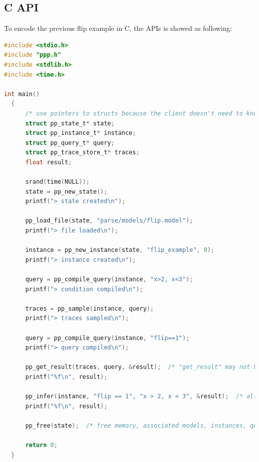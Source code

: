 \subsection{C API}
To encode the previous flip example in C, the APIs is showed as following:
\begin{lstlisting}[language=C]
#include <stdio.h>
#include "ppp.h"
#include <stdlib.h>
#include <time.h>

int main()
  {
      /* use pointers to structs because the client doesn't need to know the struct sizes */
      struct pp_state_t* state;
      struct pp_instance_t* instance;
      struct pp_query_t* query;
      struct pp_trace_store_t* traces;
      float result;

      srand(time(NULL));
      state = pp_new_state();
      printf("> state created\n");

      pp_load_file(state, "parse/models/flip.model");
      printf("> file loaded\n");

      instance = pp_new_instance(state, "flip_example", 0);
      printf("> instance created\n");

      query = pp_compile_query(instance, "x>2, x<3");
      printf("> condition compiled\n");

      traces = pp_sample(instance, query);
      printf("> traces sampled\n");

      query = pp_compile_query(instance, "flip==1");
      printf("> query compiled\n");

      pp_get_result(traces, query, &result);  /* "get_result" may not be a good name */
      printf("%f\n", result);

      pp_infer(instance, "flip == 1", "x > 2, x < 3", &result);  /* alternative way to get a result */
      printf("%f\n", result);

      pp_free(state);  /* free memory, associated models, instances, queries, and trace stores are deallocated */

      return 0;
  }
\end{lstlisting}
  
